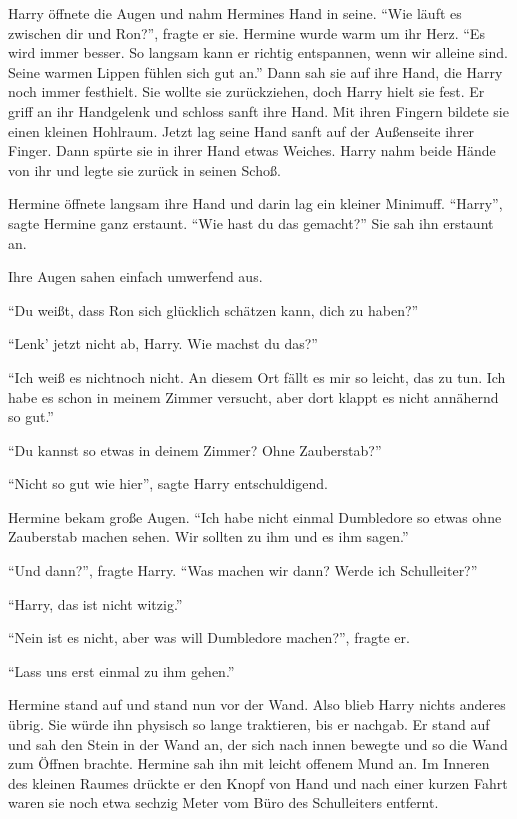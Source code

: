 Harry öffnete die Augen und nahm Hermines Hand in seine. \enquote{Wie läuft es zwischen dir und Ron?}, fragte er sie. Hermine wurde warm um ihr Herz. \enquote{Es wird immer besser. So langsam kann er richtig entspannen, wenn wir alleine sind. Seine warmen Lippen fühlen sich gut an.} Dann sah sie auf ihre Hand, die Harry noch immer festhielt. Sie wollte sie zurückziehen, doch Harry hielt sie fest. Er griff an ihr Handgelenk und schloss sanft ihre Hand. Mit ihren Fingern bildete sie einen kleinen Hohlraum. Jetzt lag seine Hand sanft auf der Außenseite ihrer Finger. Dann spürte sie in ihrer Hand etwas Weiches. Harry nahm beide Hände von ihr und legte sie zurück in seinen Schoß.

Hermine öffnete langsam ihre Hand und darin lag ein kleiner Minimuff. \enquote{Harry}, sagte Hermine ganz erstaunt. \enquote{Wie hast du das gemacht?} Sie sah ihn erstaunt an.

Ihre Augen sahen einfach umwerfend aus.

\enquote{Du weißt, dass Ron sich glücklich schätzen kann, dich zu haben?}

\enquote{Lenk' jetzt nicht ab, Harry. Wie machst du das?}

\enquote{Ich weiß es nicht\abs noch nicht. An diesem Ort fällt es mir so leicht, das zu tun. Ich habe es schon in meinem Zimmer versucht, aber dort klappt es nicht annähernd so gut.}

\enquote{Du kannst so etwas in deinem Zimmer? Ohne Zauberstab?}

\enquote{Nicht so gut wie hier}, sagte Harry entschuldigend.

Hermine bekam große Augen. \enquote{Ich habe nicht einmal Dumbledore so etwas ohne Zauberstab machen sehen. Wir sollten zu ihm und es ihm sagen.}

\enquote{Und dann?}, fragte Harry. \enquote{Was machen wir dann? Werde ich Schulleiter?}

\enquote{Harry, das ist nicht witzig.}

\enquote{Nein ist es nicht, aber was will Dumbledore machen?}, fragte er.

\enquote{Lass uns erst einmal zu ihm gehen.}

Hermine stand auf und stand nun vor der Wand. Also blieb Harry nichts anderes übrig. Sie würde ihn physisch so lange traktieren, bis er nachgab. Er stand auf und sah den Stein in der Wand an, der sich nach innen bewegte und so die Wand zum Öffnen brachte. Hermine sah ihn mit leicht offenem Mund an. Im Inneren des kleinen Raumes drückte er den Knopf von Hand und nach einer kurzen Fahrt waren sie noch etwa sechzig Meter vom Büro des Schulleiters entfernt.

